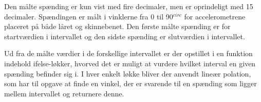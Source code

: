 Den målte spænding er kun vist med fire decimaler, men er oprindeligt med 15 decimaler. Spændingen er målt i vinklerne fra 0 til 90$^{circ}$ for accelerometrene placeret på både låret og skinnebenet. Den første målte spænding er for startværdien i intervallet og den sidste spænding er slutværdien i intervallet.

Ud fra de målte værdier i de forskellige intervallet er der opstillet i en funktion indehold ifelse-løkker, hvorved det er muligt at vurdere hvilket interval en given spænding befinder sig i. I hver enkelt løkke bliver der anvendt lineær polation, som har til opgave at finde en vinkel, der er svarende til en spænding som ligger mellem intervallet og returnere denne. 





